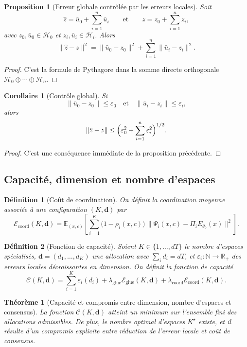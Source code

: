 \documentclass[11pt,a4paper]{article}
\newtheorem{definition}{Définition}[section]
\newtheorem{proposition}{Proposition}[section]
\newtheorem{theorem}{Théorème}[section]
\newtheorem{corollary}{Corollaire}[section]
\newcommand{\Hh}{\mathcal H}
\newcommand{\R}{\mathbb R}
\newcommand{\1}{\mathbf 1}
\begin{document}
\begin{proposition}[Erreur globale contrôlée par les erreurs locales]
Soit
\[
\hat z=\bar u_0+\sum_{i=1}^n \bar u_i
\qquad\text{et}\qquad
z=z_0+\sum_{i=1}^n z_i,
\]
avec \(z_0,\bar u_0\in\Hh_0\) et \(z_i,\bar u_i\in\Hh_i\).  
Alors
\[
\|\hat z-z\|^2
=
\|\bar u_0-z_0\|^2+\sum_{i=1}^n\|\bar u_i-z_i\|^2.
\]
\end{proposition}

\begin{proof}
C'est la formule de Pythagore dans la somme directe orthogonale \(\Hh_0\oplus\cdots\oplus\Hh_n\).
\end{proof}

\begin{corollary}[Contrôle global]
Si
\[
\|\bar u_0-z_0\|\le \varepsilon_0
\quad\text{et}\quad
\|\bar u_i-z_i\|\le \varepsilon_i,
\]
alors
\[
\|\hat z-z\|
\le
\Bigl(\varepsilon_0^2+\sum_{i=1}^n \varepsilon_i^2\Bigr)^{1/2}.
\]
\end{corollary}

\begin{proof}
C'est une conséquence immédiate de la proposition précédente.
\end{proof}

\subsection{Capacité, dimension et nombre d'espaces}

\begin{definition}[Coût de coordination]
On définit la coordination moyenne associée à une configuration \((K,\mathbf d)\) par
\[
\mathcal E_{\mathrm{coord}}(K,\mathbf d)
=
\mathbb E_{(x,c)}\!\left[
\sum_{i=1}^{K}\bigl(1-\rho_i(x,c)\bigr)\,
\bigl\|\Psi_i(x,c)-\Pi_i E_{\theta_0}(x)\bigr\|^2
\right].
\]
\end{definition}

\begin{definition}[Fonction de capacité]
Soient \(K\in\{1,\dots,dT\}\) le nombre d'espaces spécialisés, \(\mathbf d=(d_1,\dots,d_K)\) une allocation avec \(\sum_i d_i=dT\), et \(\varepsilon_i:\mathbb N\to\R_+\) des erreurs locales décroissantes en dimension.  
On définit la fonction de capacité
\[
\mathcal C(K,\mathbf d)
=
\sum_{i=1}^K \varepsilon_i(d_i)
+
\lambda_{\mathrm{glue}}\mathcal E_{\mathrm{glue}}(K,\mathbf d)
+
\lambda_{\mathrm{coord}}\mathcal E_{\mathrm{coord}}(K,\mathbf d).
\]
\end{definition}

\begin{theorem}[Capacité et compromis entre dimension, nombre d'espaces et consensus]
La fonction \(\mathcal C(K,\mathbf d)\) atteint un minimum sur l'ensemble fini des allocations admissibles.  
De plus, le nombre optimal d'espaces \(K^\star\) existe, et il résulte d'un compromis explicite entre réduction de l'erreur locale et coût de consensus.
\end{theorem}
\end{document}
